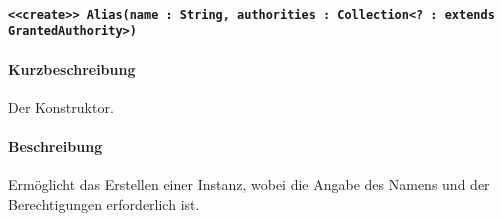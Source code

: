 \paragraph{\texttt{<<create>> Alias(name : String, authorities : Collection<? : extends GrantedAuthority>)}}%
\paragraph*{Kurzbeschreibung}
Der Konstruktor.
\paragraph*{Beschreibung}
Ermöglicht das Erstellen einer Instanz, wobei die Angabe des Namens und der Berechtigungen erforderlich ist.
